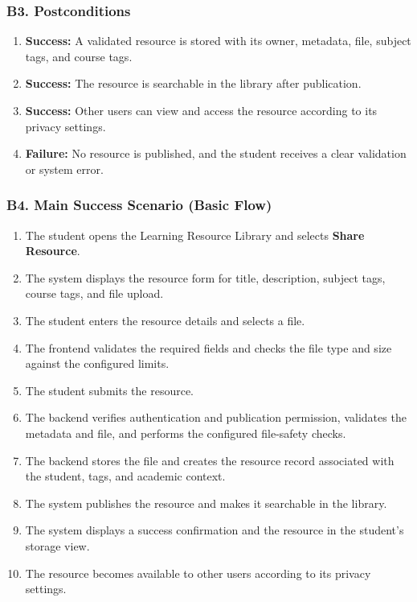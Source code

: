 \documentclass[12pt]{article}
\begin{document}
\hypertarget{sec:b3-postconditions}{}
\subsubsection*{B3. Postconditions}
\par\medskip

\begin{enumerate}
\item \textbf{Success:} A validated resource is stored with its owner, metadata, file, subject tags, and course tags.
\item \textbf{Success:} The resource is searchable in the library after publication.
\item \textbf{Success:} Other users can view and access the resource according to its privacy settings.
\item \textbf{Failure:} No resource is published, and the student receives a clear validation or system error.
\end{enumerate}
\par\medskip

\hypertarget{sec:b4-main-success-scenario-basic-flow}{}
\subsubsection*{B4. Main Success Scenario (Basic Flow)}
\par\medskip

\begin{enumerate}
\item The student opens the Learning Resource Library and selects \textbf{Share Resource}.
\item The system displays the resource form for title, description, subject tags, course tags, and file upload.
\item The student enters the resource details and selects a file.
\item The frontend validates the required fields and checks the file type and size against the configured limits.
\item The student submits the resource.
\item The backend verifies authentication and publication permission, validates the metadata and file, and performs the configured file-safety checks.
\item The backend stores the file and creates the resource record associated with the student, tags, and academic context.
\item The system publishes the resource and makes it searchable in the library.
\item The system displays a success confirmation and the resource in the student's storage view.
\item The resource becomes available to other users according to its privacy settings.
\end{enumerate}
\par\medskip
\end{document}
